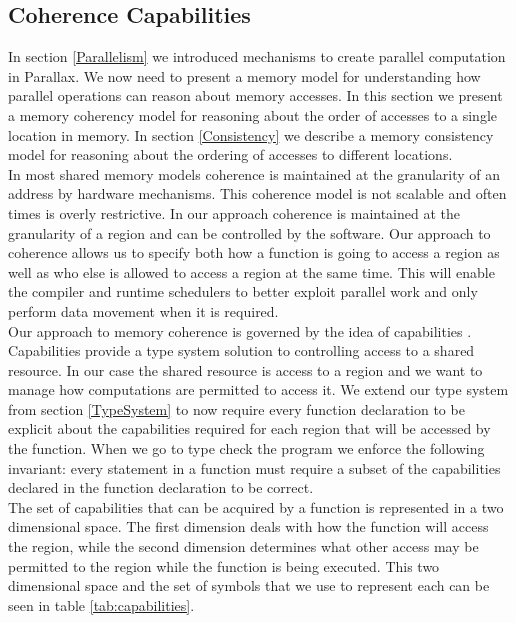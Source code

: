 \documentclass{article}
\theoremstyle{definition}
\begin{document}
\subsection{Coherence Capabilities \label{Coherence}}
\noindent
In section \ref{Parallelism} we introduced mechanisms to create parallel computation
in Parallax.  We now need to present a memory model for understanding how
parallel operations can reason about memory accesses.  In this section we present
a memory coherency model for reasoning about the order of accesses to a single location
in memory.  In section \ref{Consistency} we describe a memory consistency model for
reasoning about the ordering of accesses to different locations. \\

\noindent
In most shared memory models coherence is maintained at the granularity of an address 
by hardware mechanisms.  This coherence model is not scalable and often times is 
overly restrictive.  In our approach coherence is maintained at the granularity of a 
region and can be controlled by the software.  Our approach to coherence allows us to
specify both how a function is going to access a region as well as who else is allowed
to access a region at the same time.  This will enable the compiler and runtime schedulers
to better exploit parallel work and only perform data movement when it is required. \\

\noindent
Our approach to memory coherence is governed by the idea of capabilities \cite{Stork09,Bierhoff07}.
Capabilities provide a type system solution to controlling access to a shared resource.
In our case the shared resource is access to a region and we want to manage how
computations are permitted to access it.  We extend our type system from section \ref{TypeSystem}
to now require every function declaration to be explicit about the capabilities required
for each region that will be accessed by the function.  When we go to type check the program
we enforce the following invariant: every statement in a function must require a subset of the
capabilities declared in the function declaration to be correct. \\

\noindent
The set of capabilities that can be acquired by a function is represented in a two dimensional
space.  The first dimension deals with how the function will access the region, while the
second dimension determines what other access may be permitted to the region while the function
is being executed.  This two dimensional space and the set of symbols that we use to represent
each can be seen in table \ref{tab:capabilities}.
\end{document}
